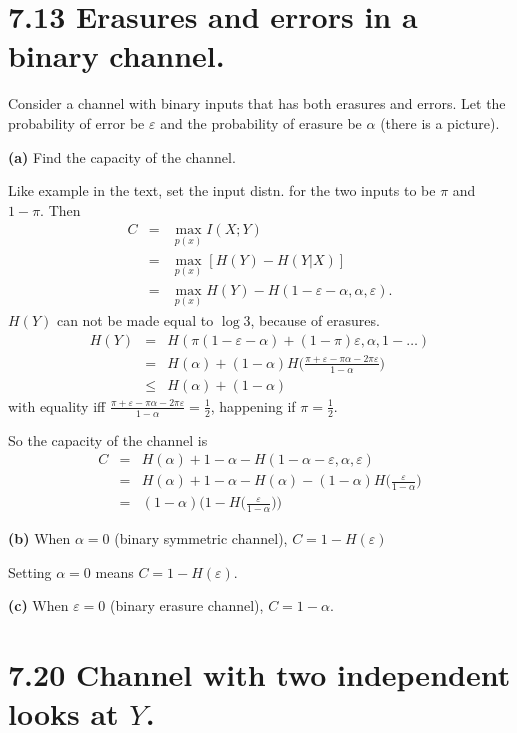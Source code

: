 \documentclass[10pt]{article}
\begin{document}
\begin{tiny}
\begin{multicols}{3}
\section*{7.13 Erasures and errors in a binary channel.}
Consider a channel with binary inputs that has both erasures and errors. Let the probability of error be $\varepsilon$ and the probability of erasure be $\alpha$ (there is a picture).

\textbf{(a)} Find the capacity of the channel.

Like example in the text, set the input distn. for the two inputs to be $\pi$ and $1-\pi$. Then
\begin{eqnarray*}
    C &=& \max_{p(x)}I(X;Y) \\
    &=& \max_{p(x)}[H(Y) - H(Y|X)] \\
    &=& \max_{p(x)}H(Y) - H(1-\varepsilon-\alpha,\alpha,\varepsilon).
\end{eqnarray*}
$H(Y)$ can not be made equal to $\log 3$, because of erasures. 
\begin{eqnarray*}
    H(Y) &=& H( \pi(1-\varepsilon-\alpha) + (1-\pi)\varepsilon,\alpha, 1 - \dots)\\ %
    &=& H(\alpha) + (1-\alpha)H\bigg(\frac{\pi+\varepsilon -\pi\alpha-2\pi\varepsilon}{1-\alpha}\bigg) \\
    &\le& H(\alpha) + (1-\alpha)
\end{eqnarray*}
with equality iff $\frac{\pi+\varepsilon -\pi\alpha-2\pi\varepsilon}{1-\alpha} = \frac{1}{2}$, happening if $\pi = \frac{1}{2}$.

So the capacity of the channel is
\begin{eqnarray*}
    C &=& H(\alpha) + 1 - \alpha - H(1-\alpha-\varepsilon,\alpha,\varepsilon) \\
    &=& H(\alpha) + 1 - \alpha - H(\alpha) - (1-\alpha) H\bigg(\frac{\varepsilon}{1-\alpha}\bigg) \\
    &=& (1-\alpha) \bigg(1 - H\bigg(\frac{\varepsilon}{1-\alpha}\bigg)\bigg)
\end{eqnarray*}

\textbf{(b)} When $\alpha = 0$ (binary symmetric channel), $C = 1- H(\varepsilon)$

Setting $\alpha = 0$ means $C=1-H(\varepsilon)$.

\textbf{(c)} When $\varepsilon = 0$ (binary erasure channel), $C=1-\alpha$.

\section*{7.20 Channel with two independent looks at $Y$.}


\end{multicols}
\end{tiny}
\end{document}
